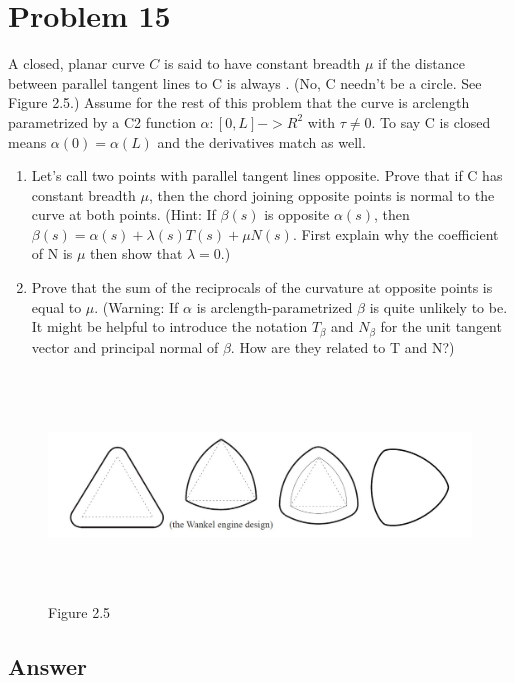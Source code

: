 \documentclass[
	12pt, %
]{fphw}
\theoremstyle{plain}
\begin{document}
\section*{Problem 15}
\begin{problem}
     A closed, planar curve $C$ is said to have constant breadth $\mu$ if the distance between parallel tangent
lines to C is always . (No, C needn’t be a circle. See Figure 2.5.) Assume for the rest of this problem
that the curve is arclength parametrized by a C2 function $\alpha:[0,L]-> R^{2}$ with $\tau \neq 0$. To say C is closed
means $\alpha(0) = \alpha(L)$ and the derivatives match as well.
\begin{enumerate} %
     \item Let’s call two points with parallel tangent lines opposite. Prove that if C has constant breadth
     $\mu$, then the chord joining opposite points is normal to the curve at both points. (Hint: If $\beta(s)$ is
     opposite $\alpha(s)$, then $\beta(s) = \alpha(s) + \lambda(s)T(s)+ \mu N(s)$. First explain why the coefficient of N is $\mu$
     then show that $\lambda = 0$.)
     \item Prove that the sum of the reciprocals of the curvature at opposite points is equal to $\mu$. (Warning: If
     $\alpha$ is arclength-parametrized $\beta$ is quite unlikely to be. It might be helpful to introduce the notation
     $T_{\beta}$ and $N_{\beta}$ for the unit tangent vector and principal normal of $\beta$. How are they related to T and
     N?)
\end{enumerate}
\end{problem}
\begin{figure}[!ht]
     \centering
     \includegraphics[width=\linewidth, width=14cm, height=6cm]{question_15.jpg}
     \caption{Figure 2.5}
\end{figure}
\subsection*{Answer}
\end{document}
